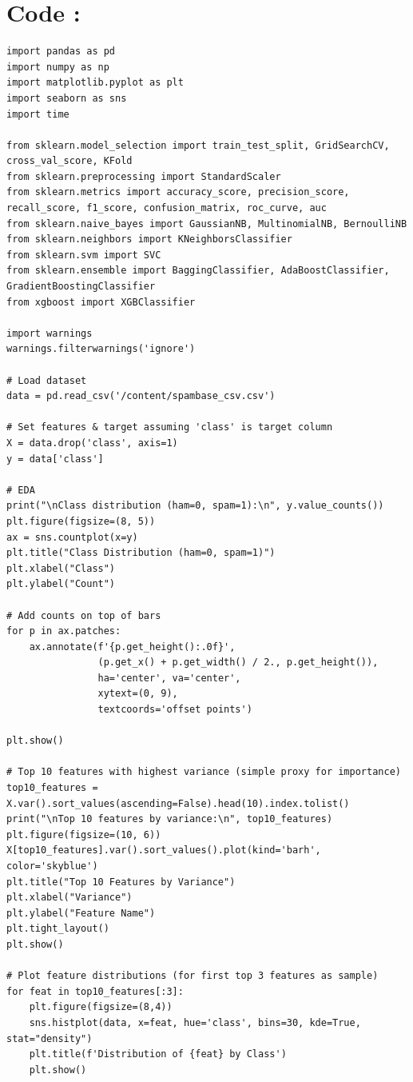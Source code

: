 \documentclass[12pt]{article}
\begin{document}
\section*{Code : }
\begin{verbatim}
import pandas as pd
import numpy as np
import matplotlib.pyplot as plt
import seaborn as sns
import time

from sklearn.model_selection import train_test_split, GridSearchCV, cross_val_score, KFold
from sklearn.preprocessing import StandardScaler
from sklearn.metrics import accuracy_score, precision_score, recall_score, f1_score, confusion_matrix, roc_curve, auc
from sklearn.naive_bayes import GaussianNB, MultinomialNB, BernoulliNB
from sklearn.neighbors import KNeighborsClassifier
from sklearn.svm import SVC
from sklearn.ensemble import BaggingClassifier, AdaBoostClassifier, GradientBoostingClassifier
from xgboost import XGBClassifier

import warnings
warnings.filterwarnings('ignore')

# Load dataset
data = pd.read_csv('/content/spambase_csv.csv')

# Set features & target assuming 'class' is target column
X = data.drop('class', axis=1)
y = data['class']

# EDA
print("\nClass distribution (ham=0, spam=1):\n", y.value_counts())
plt.figure(figsize=(8, 5))
ax = sns.countplot(x=y)
plt.title("Class Distribution (ham=0, spam=1)")
plt.xlabel("Class")
plt.ylabel("Count")

# Add counts on top of bars
for p in ax.patches:
    ax.annotate(f'{p.get_height():.0f}',
                (p.get_x() + p.get_width() / 2., p.get_height()),
                ha='center', va='center',
                xytext=(0, 9),
                textcoords='offset points')

plt.show()

# Top 10 features with highest variance (simple proxy for importance)
top10_features = X.var().sort_values(ascending=False).head(10).index.tolist()
print("\nTop 10 features by variance:\n", top10_features)
plt.figure(figsize=(10, 6))
X[top10_features].var().sort_values().plot(kind='barh', color='skyblue')
plt.title("Top 10 Features by Variance")
plt.xlabel("Variance")
plt.ylabel("Feature Name")
plt.tight_layout()
plt.show()

# Plot feature distributions (for first top 3 features as sample)
for feat in top10_features[:3]:
    plt.figure(figsize=(8,4))
    sns.histplot(data, x=feat, hue='class', bins=30, kde=True, stat="density")
    plt.title(f'Distribution of {feat} by Class')
    plt.show()


\end{verbatim}
\end{document}
